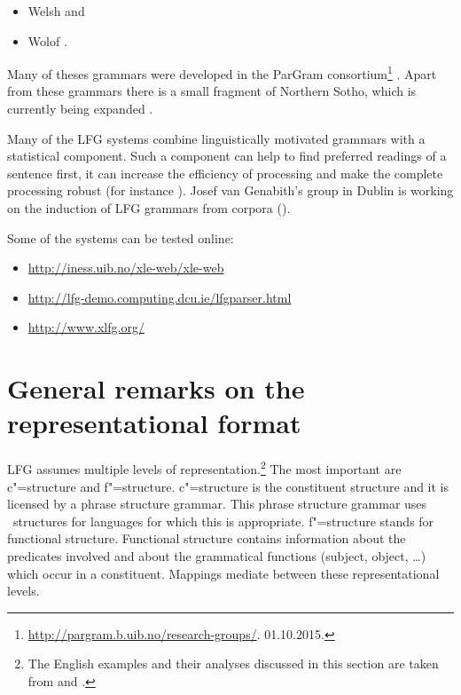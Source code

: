 \begin{itemize}
\item Welsh \citep{MS2005a-u}
and
\item Wolof \citep{Dione2012b-u,Dione2013a-u}.
\end{itemize}
Many of theses grammars were developed in the ParGram consortium\footnote{
  \url{http://pargram.b.uib.no/research-groups/}. 01.10.2015.
} \citep*{BKNS99a-ed,BDKMR02a-u}. Apart from these grammars there is a small fragment of Northern
Sotho, which is currently being expanded \citep{Faasz2010a-u}. 


Many of the LFG systems combine linguistically motivated grammars with a statistical
component. Such a component can help to find preferred readings of a sentence first,
it can increase the efficiency of processing and make the complete processing robust (for instance
\citealp{KRKMVC2004a-u,RKKCMJ2002a-u}). Josef van Genabith's group in Dublin is working on the induction of
LFG grammars from corpora (\eg \citealp{JGCCR99a-andere-anfuehrungszeichen,DBCGW2005a-u,CBFDRCW2005a-u,CG2006a-u,GWG2007a-u,CBDRGW2008a-u,SG2009a-u}). 

Some of the systems can be tested online:
\begin{itemize}
\item \url{http://iness.uib.no/xle-web/xle-web}

\item \url{http://lfg-demo.computing.dcu.ie/lfgparser.html}
\item \url{http://www.xlfg.org/}
\end{itemize}




\section{General remarks on the representational format}
\label{Abschnitt-Format-LFG}

LFG assumes multiple levels of representation.\footnote{
	The English examples and their analyses discussed in this section are taken from
        \citet{Dalrymple2001a-u} and \citet{Dalrymple2006a}.
} The most important are c"=structure and f"=structure. c"=structure is the constituent
structure and it is licensed by a phrase structure grammar. This phrase structure grammar uses
\xbar~structures for languages for which this is appropriate. f"=structure stands for functional structure. Functional structure contains information about the predicates involved
and about the grammatical functions (subject, object, \ldots) which occur in a constituent. Mappings
mediate between these representational levels.


